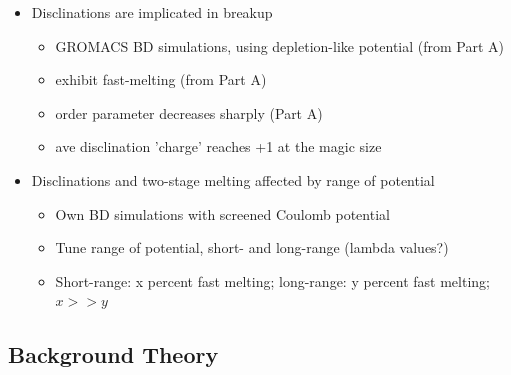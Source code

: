 \documentclass{umthesis}          %
\begin{document}
\begin{itemize}

\item Disclinations are implicated in breakup\\
\label{sec-3.1.4.1}

\begin{itemize}

\item GROMACS BD simulations, using depletion-like potential (from Part A)\\
\label{sec-3.1.4.1.1}


\item exhibit fast-melting (from Part A)\\
\label{sec-3.1.4.1.2}


\item order parameter decreases sharply (Part A)\\
\label{sec-3.1.4.1.3}


\item ave disclination 'charge' reaches +1 at the magic size\\
\label{sec-3.1.4.1.4}

\end{itemize} %

\item Disclinations and two-stage melting affected by range of potential\\
\label{sec-3.1.4.2}

\begin{itemize}

\item Own BD simulations with screened Coulomb potential\\
\label{sec-3.1.4.2.1}


\item Tune range of potential, short- and long-range (lambda values?)\\
\label{sec-3.1.4.2.2}


\item Short-range: x percent fast melting; long-range: y percent fast melting; $x>>y$\\
\label{sec-3.1.4.2.3}

\end{itemize} %
\end{itemize} %
\subsection{Background Theory}
\label{sec-3.1.5}
\end{document}
